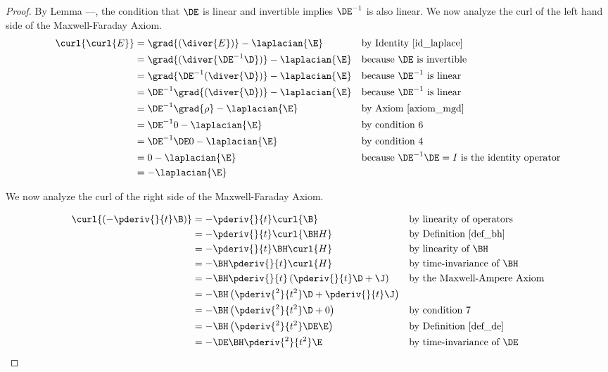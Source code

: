 \begin{proof}
By Lemma ---, %
the condition that $\DE$ is linear and invertible implies $\DE^{-1}$ is also linear.
We now analyze the curl of the left hand side of the Maxwell-Faraday Axiom.
\begin{align*}
   \curl{\curl{E}}
     &= \grad{(\diver{E})} - \laplacian{\E}
     && \text{by Identity \ref{id_laplace}}
   \\&= \grad{(\diver{\DE^{-1}\D})} - \laplacian{\E}
     && \text{because $\DE$ is invertible}
   \\&= \grad{\DE^{-1}(\diver{\D})} - \laplacian{\E}
     && \text{because $\DE^{-1}$ is linear}
   \\&= \DE^{-1}\grad{(\diver{\D})} - \laplacian{\E}
     && \text{because $\DE^{-1}$ is linear}
   \\&= \DE^{-1}\grad{\rho} - \laplacian{\E}
     && \text{by Axiom \ref{axiom_mgd}}
   \\&= \DE^{-1}0 - \laplacian{\E}
     && \text{by condition 6}
   \\&= \DE^{-1}\DE 0 - \laplacian{\E}
     && \text{by condition 4}
   \\&= 0 - \laplacian{\E}
     && \text{because $\DE^{-1}\DE=I$ is the identity operator}
   \\ &= - \laplacian{\E}
\end{align*}


We now analyze the curl of the right side of the Maxwell-Faraday Axiom.


\begin{align*}
   \curl{\left( -\pderiv{}{t}\B \right)}
     &= -\pderiv{}{t}\curl{\B}
     && \text{by linearity of operators}
   \\&= -\pderiv{}{t}\curl{\BH H}
     &&\text{by Definition \ref{def_bh}}
   \\&= -\pderiv{}{t}\BH \curl{H}
     && \text{by linearity of $\BH$}
   \\&= -\BH \pderiv{}{t} \curl{H}
     && \text{by time-invariance of $\BH$}
   \\&= -\BH \pderiv{}{t} \left( \pderiv{}{t}\D + \J   \right)
     && \text{by the Maxwell-Ampere Axiom}
   \\&= -\BH \left( \pderiv{^2}{t^2}\D + \pderiv{}{t}\J   \right)
   \\&= -\BH \left( \pderiv{^2}{t^2}\D + 0  \right)
     && \text{by condition 7}
   \\&= -\BH \left( \pderiv{^2}{t^2}\DE\E  \right)
     && \text{by Definition \ref{def_de}}
   \\&= -\DE \BH \pderiv{^2}{t^2}\E
     && \text{by time-invariance of $\DE$ }
\end{align*}




\end{proof}
